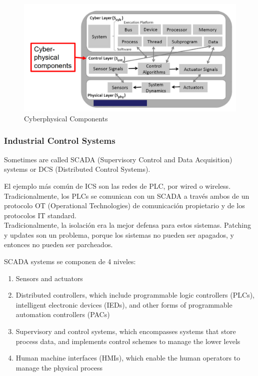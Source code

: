 \begin{figure}[htbp]
   \centering
   \includegraphics{images/06/CPScomponents.png}
   \caption{Cyberphysical Components}
   \label{fig:06/CPScomponents}
\end{figure}


\subsubsection{Industrial Control Systems}
Sometimes are called SCADA (Supervisory Control and Data Acquisition) systems or DCS (Distributed Control Systems).

El ejemplo más común de ICS son las redes de PLC, por wired o wireless. Tradicionalmente, los PLCs se comunican con un SCADA a través ambos de un protocolo OT (Operational Technologies) de comunicación propietario y de los protocolos IT standard.\\
Tradicionalmente, la isolación era la mejor defensa para estos sistemas.
Patching y updates son un problema, porque los sistemas no pueden ser apagados, y entonces no pueden ser parcheados.

SCADA systems se componen de 4 niveles:
\begin{enumerate}
	\item Sensors and actuators
	\item Distributed controllers, which include programmable logic
   controllers (PLCs), intelligent electronic devices (IEDs), and
   other forms of programmable automation controllers (PACs)
	\item Supervisory and control systems, which encompasses
   systems that store process data, and implements control
   schemes to manage the lower levels
	\item Human machine interfaces (HMIs), which enable the human
   operators to manage the physical process
\end{enumerate}

